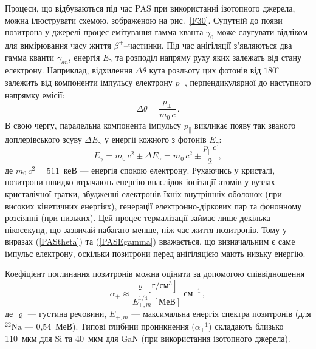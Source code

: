 Процеси, що відбуваються під час PAS при використанні ізотопного джерела, можна ілюструвати схемою,
зображеною на рис.~\ref{F30}.
Супутній до появи позитрона у джерелі процес емітування гамма кванта $\gamma_0$ може слугувати
відліком для вимірювання часу життя $\beta^+$--частинки.
Під час анігіляції з'являються два гамма кванти $\gamma_{an}$, енергія $E_\gamma$
та розподіл напряму руху яких залежать від стану електрону.
Наприклад, відхилення $\Delta\theta$ кута розльоту цих фотонів
від $180^\circ$ залежить від компоненти імпульсу електрону $p_\perp$, перпендикулярної до наступного
напрямку емісії:
\begin{equation}\label{PAStheta}
\Delta\theta=\frac{p_\perp}{m_0\,c}\,.
\end{equation}
В свою чергу, паралельна компонента імпульсу $p_\parallel$ викликає появу
так званого доплерівського зсуву $\Delta E_\gamma$ у енергії кожного з фотонів $E_\gamma$:
\begin{equation}\label{PASEgamma}
E_\gamma=m_0\,c^2\pm\Delta E_\gamma=m_0\,c^2\pm\frac{p_\parallel \,c}{2}\,,
\end{equation}
де
$m_0\,c^2=511$~кеВ --- енергія спокою електрону.
Рухаючись у кристалі,  позитрони швидко втрачають енергію внаслідок
іонізації атомів у вузлах кристалічної ґратки, збудженні електронів їхніх
внутрішніх оболонок (при високих кінетичних енергіях), генерації електронно-діркових пар та
фононному розсіянні (при низьких).
Цей процес термалізації займає лише декілька пікосекунд, що зазвичай набагато менше, ніж час життя позитронів.
Тому у виразах (\ref{PAStheta}) та (\ref{PASEgamma}) вважається, що визначальним
є саме імпульс електрону, оскільки позитрони перед анігіляцією мають низьку енергію.



Коефіцієнт поглинання позитронів можна оцінити за допомогою співвідношення \cite{PAS}
\begin{equation}
\alpha_+\approx\frac{\varrho\,\left[\text{г}/\text{см}^3\right]}{E_{+,m}^{1/4}\,[\text{МеВ}]}\:\text{см}^{-1}\,,
\end{equation}
де
$\varrho$ --- густина речовини,
$E_{+,m}$ --- максимальна енергія спектра позитронів (для $^{22}\text{Na}$ --- 0,54~МеВ).
Типові глибини проникнення ($\alpha^{-1}_+$) складають близько 110~мкм для Si та 40~мкм для GaN (при використання ізотопного джерела).

